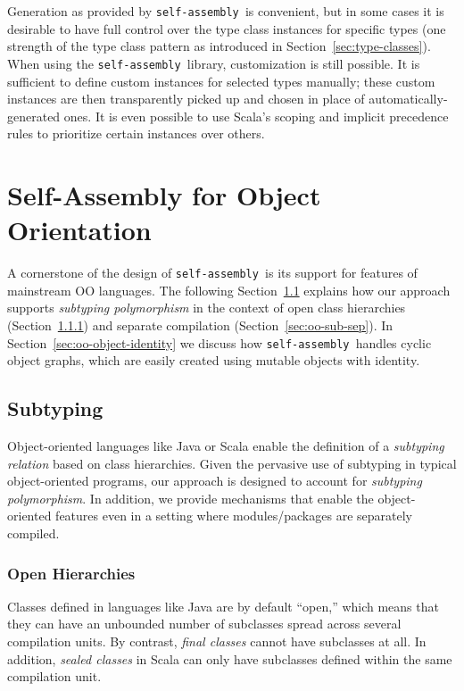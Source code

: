 \documentclass[preprint]{sigplanconf}
\newcommand{\selfassembly}{\texttt{self-assembly~}}
\begin{document}
Generation as provided by \selfassembly is convenient, but in some cases it is desirable
to have full control over the type class instances for specific types (one strength of the
type class pattern as introduced in Section~\ref{sec:type-classes}). When using the
\selfassembly library, customization is still possible. It is sufficient to define
custom instances for selected types manually; these custom instances are then transparently
picked up and chosen in place of automatically-generated ones. It is even possible to
use Scala's scoping and implicit precedence rules to prioritize certain instances over
others.

\section{Self-Assembly for Object Orientation}

A cornerstone of the design of \selfassembly is its support for features of mainstream
OO languages. The following Section~\ref{sec:oo-sub} explains how our approach supports
{\em subtyping polymorphism} in the context of open class hierarchies (Section~\ref{sec:oo-sub-open})
and separate compilation (Section~\ref{sec:oo-sub-sep}). In Section~\ref{sec:oo-object-identity}
we discuss how \selfassembly handles cyclic object graphs, which are easily created
using mutable objects with identity.


\subsection{Subtyping}\label{sec:oo-sub}

Object-oriented languages like Java or Scala enable the definition of a
\emph{subtyping relation} based on class hierarchies. Given the pervasive use
of subtyping in typical object-oriented programs, our approach is designed to
account for \emph{subtyping polymorphism}. In addition, we provide mechanisms
that enable the object-oriented features even in a setting where
modules/packages are separately compiled.

\subsubsection{Open Hierarchies}\label{sec:oo-sub-open}

Classes defined in languages like Java are by default ``open,'' which means
that they can have an unbounded number of subclasses spread across several
compilation units. By contrast, \emph{final classes} cannot have subclasses at
all. In addition, \emph{sealed classes} in Scala can only have subclasses
defined within the same compilation unit.
\end{document}
